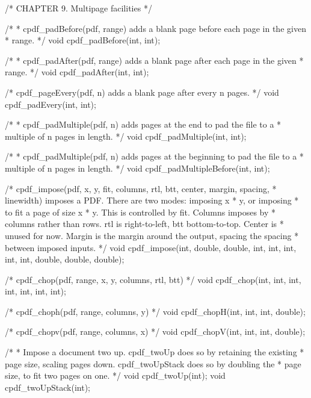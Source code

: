 /* CHAPTER 9. Multipage facilities */

/*
 * cpdf_padBefore(pdf, range) adds a blank page before each page in the given
 * range.
 */
void cpdf_padBefore(int, int);

/*
 * cpdf_padAfter(pdf, range) adds a blank page after each page in the given
 * range.
 */
void cpdf_padAfter(int, int);

/* cpdf_pageEvery(pdf, n) adds a blank page after every n pages. */
void cpdf_padEvery(int, int);

/*
 * cpdf_padMultiple(pdf, n) adds pages at the end to pad the file to a
 * multiple of n pages in length.
 */
void cpdf_padMultiple(int, int);

/*
 * cpdf_padMultiple(pdf, n) adds pages at the beginning to pad the file to a
 * multiple of n pages in length.
 */
void cpdf_padMultipleBefore(int, int);

/* cpdf_impose(pdf, x, y, fit, columns, rtl, btt, center, margin, spacing,
 * linewidth) imposes a PDF. There are two modes: imposing x * y, or imposing
 * to fit a page of size x * y. This is controlled by fit. Columns imposes by
 * columns rather than rows. rtl is right-to-left, btt bottom-to-top. Center is
 * unused for now. Margin is the margin around the output, spacing the spacing
 * between imposed inputs. */
void cpdf_impose(int, double, double, int, int, int, int, int, double, double,
                 double);

/* cpdf_chop(pdf, range, x, y, columns, rtl, btt) */
void cpdf_chop(int, int, int, int, int, int, int);

/* cpdf_choph(pdf, range, columns, y) */
void cpdf_chopH(int, int, int, double);

/* cpdf_chopv(pdf, range, columns, x) */
void cpdf_chopV(int, int, int, double);

/*
 * Impose a document two up. cpdf_twoUp does so by retaining the existing
 * page size, scaling pages down. cpdf_twoUpStack does so by doubling the
 * page size, to fit two pages on one.
 */
void cpdf_twoUp(int);
void cpdf_twoUpStack(int);

